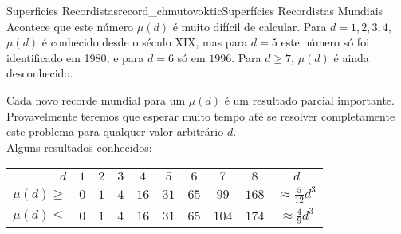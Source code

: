 \begin{surferIntroPage}{Superficies Recordistas}{record_chmutovoktic}{Superf\'icies Recordistas Mundiais}
 Acontece que este n\'umero $\mu(d)$ \'e muito dif\'icil de calcular.
Para $d=1,2,3,4$, $\mu(d)$ \'e conhecido desde o s\'eculo XIX, mas  para $d=5$  este n\'umero s\'o foi identificado em 1980, e para $d=6$ s\'o em $1996$.   Para $d \ge 7$, $\mu(d)$ \'e ainda desconhecido.
  
    Cada novo recorde mundial para um $\mu(d)$ \'e um  resultado parcial importante. Provavelmente teremos que esperar muito tempo at\'e se  resolver completamente este  problema para qualquer valor arbitr\'ario $d$.\\  Alguns resultados conhecidos:
    
   \begin{center}
      \begin{tabular}{r|cccccccc|c}
        $d$ & $1$ & $2$ & $3$ & $4$ & $5$ & $6$ & $7$ & $8$ & $d$\\
        \hline
        \hline
        \rule{0pt}{1.2em}$\mu(d)\ge$ & $0$ & $1$ & $4$ & $16$ & $31$ & $65$ &
        $99$ & $168$ & 
        $\approx \frac{5}{12}d^3$\\[0.3em]
        \hline
        \rule{0pt}{1.2em}$\mu(d)\le$ & $0$ & $1$ & $4$ & $16$ & $31$ & $65$ &
        $104$ & $174$ & $\approx \frac{4}{9}d^3$
      \end{tabular}
    \end{center}
\end{surferIntroPage}
